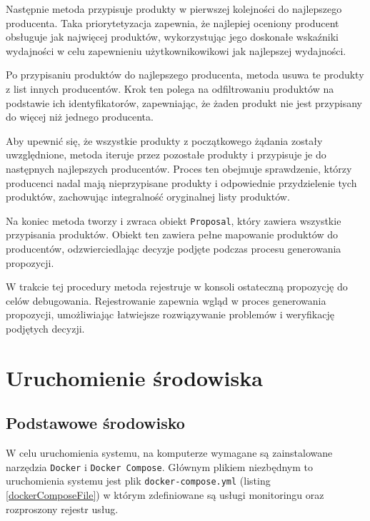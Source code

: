 \begin{itemize}
    Następnie metoda przypisuje produkty w pierwszej kolejności do najlepszego producenta. Taka priorytetyzacja zapewnia, że najlepiej oceniony producent obsługuje jak najwięcej produktów, wykorzystując jego doskonałe wskaźniki wydajności w celu zapewnieniu użytkownikowikowi jak najlepszej wydajności.

    Po przypisaniu produktów do najlepszego producenta, metoda usuwa te produkty z list innych producentów. Krok ten polega na odfiltrowaniu produktów na podstawie ich identyfikatorów, zapewniając, że żaden produkt nie jest przypisany do więcej niż jednego producenta.

    Aby upewnić się, że wszystkie produkty z początkowego żądania zostały uwzględnione, metoda iteruje przez pozostałe produkty i przypisuje je do następnych najlepszych producentów. Proces ten obejmuje sprawdzenie, którzy producenci nadal mają nieprzypisane produkty i odpowiednie przydzielenie tych produktów, zachowując integralność oryginalnej listy produktów.
    
    Na koniec metoda tworzy i zwraca obiekt \verb|Proposal|, który zawiera wszystkie przypisania produktów. Obiekt ten zawiera pełne mapowanie produktów do producentów, odzwierciedlając decyzje podjęte podczas procesu generowania propozycji.

    W trakcie tej procedury metoda rejestruje w konsoli ostateczną propozycję do celów debugowania. Rejestrowanie zapewnia wgląd w proces generowania propozycji, umożliwiając łatwiejsze rozwiązywanie problemów i weryfikację podjętych decyzji.
\end{itemize}
\section{Uruchomienie środowiska}

\subsection{Podstawowe środowisko}

W celu uruchomienia systemu, na komputerze wymagane są zainstalowane narzędzia \verb|Docker| i \verb|Docker Compose|. Głównym plikiem niezbędnym to uruchomienia systemu jest plik \verb|docker-compose.yml| (listing \ref{dockerComposeFile}) w którym zdefiniowane są usługi monitoringu oraz rozproszony rejestr usług.

